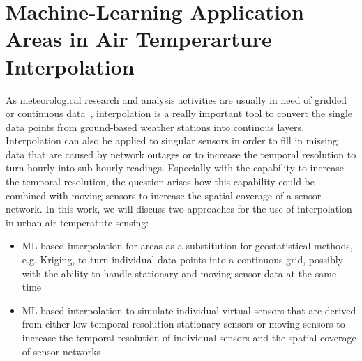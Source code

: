 \section{Machine-Learning Application Areas in Air Temperarture Interpolation}

As meteorological research and analysis activities are usually in need of gridded or continuous data~\cite{sekulic2020spatio}, interpolation is a really important tool to convert the single data points from ground-based weather stations into continous layers. Interpolation can also be applied to singular sensors in order to fill in missing data that are caused by network outages or to increase the temporal resolution to turn hourly into sub-hourly readings. Especially with the capability to increase the temporal resolution, the question arises how this capability could be combined with moving sensors to increase the spatial coverage of a sensor network. In this work, we will discuss two approaches for the use of interpolation in urban air temperatute sensing:

\begin{itemize}
    \item ML-based interpolation for areas as a substitution for geostatistical methods, e.g. Kriging, to turn individual data points into a continuous grid, possibly with the ability to handle stationary and moving sensor data at the same time
    \item ML-based interpolation to simulate individual virtual sensors that are derived from either low-temporal resolution stationary sensors or moving sensors to increase the temporal resolution of individual sensors and the spatial coverage of sensor networks
\end{itemize}

